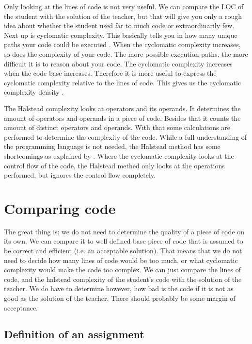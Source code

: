 \documentclass{article}
\begin{document}
Only looking at the lines of code is not very useful. We can compare the LOC of
the student with the solution of the teacher, but that will give you only a
rough idea about whether the student used far to much code or extraordinarily
few. Next up is cyclomatic complexity. This basically tells you in how many
unique paths your code could be executed \citep{website:js-complexity}. When
the cyclomatic complexity increases, so does the complexity of your code. The
more possible execution paths, the more difficult it is to reason about your
code. The cyclomatic complexity increases when the code base
increases. Therefore it is more useful to express the cyclomatic complexity
relative to the lines of code. This gives us the cyclomatic complexity density
\citep{gill1991cyclomatic}.

The Halstead complexity looks at operators and its operands. It determines the
amount of operators and operands in a piece of code. Besides that it counts the
amount of distinct operators and operands. With that some calculations are
performed to determine the complexity of the code. While a full understanding
of the programming language is not needed, the Halstead method has some
shortcomings as explained by \citet{yu2010survey}. Where the cyclomatic
complexity looks at the control flow of the code, the Halstead methed only
looks at the operations performed, but ignores the control flow completely.

\section{Comparing code}

The great thing is: we do not need to determine the quality of a piece of code
on its own. We can compare it to well defined base piece of code that is
assumed to be correct and efficient (i.e. an acceptable solution). That means
that we do not need to decide how many lines of code would be too much, or what
cyclomatic complexity would make the code too complex. We can just compare the
lines of code, and the halstead complexity of the student's code with the
solution of the teacher. We do have to determine however, how bad is the code
if it is not as good as the solution of the teacher. There should probably be
some margin of acceptance.

\subsection{Definition of an assignment}
\end{document}
